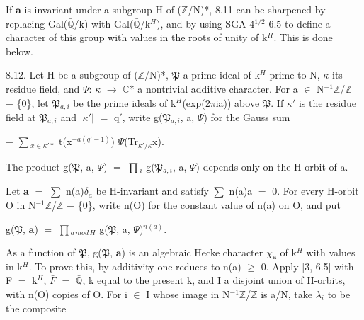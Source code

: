 \documentclass[10pt,twoside]{article}
\begin{document}
If \ensuremath{𝐚} is invariant under a subgroup H of (\ensuremath{ℤ}/N)*, 8.11 can be sharpened by replacing Gal(\ensuremath{\bar{ℚ}}/k) with Gal(\ensuremath{\bar{ℚ}}/k\ensuremath{^{H}}), and by using SGA 4\ensuremath{^{1/2}} 6.5 to define a character of this group with values in the roots of unity of k\ensuremath{^{H}}. This is done below.\par
8.12. Let H be a subgroup of (\ensuremath{ℤ}/N)*, \ensuremath{𝔓} a prime ideal of k\ensuremath{^{H}} prime to N, \ensuremath{κ} its residue field, and \ensuremath{Ψ}: \ensuremath{κ} \ensuremath{→} \ensuremath{ℂ}* a nontrivial additive character. For a \ensuremath{∈} N\ensuremath{^{-1}}\ensuremath{ℤ}/\ensuremath{ℤ} \ensuremath{−} \{0\}, let \ensuremath{𝔓}\ensuremath{_{a,i}} be the prime ideals of k\ensuremath{^{H}}(exp(2\ensuremath{π}ia)) above \ensuremath{𝔓}. If \ensuremath{κ}\ensuremath{′} is the residue field at \ensuremath{𝔓}\ensuremath{_{a,i}} and \ensuremath{|}\ensuremath{κ}\ensuremath{′}\ensuremath{|} \ensuremath{=} q\ensuremath{′}, write g(\ensuremath{𝔓}\ensuremath{_{a,i}}, a, \ensuremath{Ψ}) for the Gauss sum\par
\ensuremath{−} \ensuremath{∑}\ensuremath{_{x∈κ′*}} t(x\ensuremath{^{−a(q′−1)}}) \ensuremath{Ψ}(Tr\ensuremath{_{κ′/κ}}x).\par
The product g(\ensuremath{𝔓}, a, \ensuremath{Ψ}) \ensuremath{=} \ensuremath{∏}\ensuremath{_{i}} g(\ensuremath{𝔓}\ensuremath{_{a,i}}, a, \ensuremath{Ψ}) depends only on the H-orbit of a.\par
Let \ensuremath{𝐚} \ensuremath{=} \ensuremath{∑} n(a)\ensuremath{δ}\ensuremath{_{a}} be H-invariant and satisfy \ensuremath{∑} n(a)a \ensuremath{=} 0. For every H-orbit O in N\ensuremath{^{-1}}\ensuremath{ℤ}/\ensuremath{ℤ} \ensuremath{−} \{0\}, write n(O) for the constant value of n(a) on O, and put\par
g(\ensuremath{𝔓}, \ensuremath{𝐚}) \ensuremath{=} \ensuremath{∏}\ensuremath{_{a\,mod\,H}} g(\ensuremath{𝔓}, a, \ensuremath{Ψ})\ensuremath{^{n(a)}}.\par
As a function of \ensuremath{𝔓}, g(\ensuremath{𝔓}, \ensuremath{𝐚}) is an algebraic Hecke character \ensuremath{χ}\ensuremath{_{𝐚}} of k\ensuremath{^{H}} with values in k\ensuremath{^{H}}. To prove this, by additivity one reduces to n(a) \ensuremath{≥} 0. Apply [3, 6.5] with F \ensuremath{=} k\ensuremath{^{H}}, \ensuremath{\bar{F}} \ensuremath{=} \ensuremath{\bar{ℚ}}, k equal to the present k, and I a disjoint union of H-orbits, with n(O) copies of O. For i \ensuremath{∈} I whose image in N\ensuremath{^{-1}}\ensuremath{ℤ}/\ensuremath{ℤ} is a/N, take \ensuremath{λ}\ensuremath{_{i}} to be the composite\par
\end{document}
